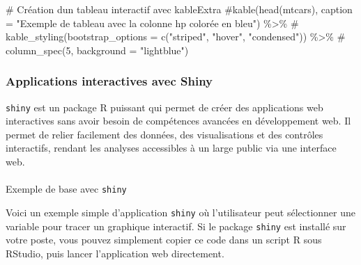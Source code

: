 \documentclass[
  letterpaper,
  DIV=11,
  numbers=noendperiod]{scrreprt}
\makeatletter
\let\oldparagraph\paragraph
\renewcommand{\paragraph}{
    \@ifstar
      \xxxParagraphStar
      \xxxParagraphNoStar
  }
\newcommand{\xxxParagraphStar}[1]{\oldparagraph*{#1}\mbox{}}
\newcommand{\xxxParagraphNoStar}[1]{\oldparagraph{#1}\mbox{}}
\newenvironment{Shaded}{\begin{snugshade}}{\end{snugshade}}
\newcommand{\CommentTok}[1]{\textcolor[rgb]{0.37,0.37,0.37}{#1}}
\makeatother
\begin{document}
\begin{Shaded}
\begin{Highlighting}[]
\CommentTok{\# Création d\textquotesingle{}un tableau interactif avec kableExtra}
\CommentTok{\#kable(head(mtcars), caption = "Exemple de tableau avec la colonne hp colorée en bleu") \%\textgreater{}\%}
\CommentTok{\#  kable\_styling(bootstrap\_options = c("striped", "hover", "condensed")) \%\textgreater{}\%}
\CommentTok{\#  column\_spec(5, background = "lightblue")}
\end{Highlighting}
\end{Shaded}

\subsubsection{Applications interactives avec
Shiny}\label{applications-interactives-avec-shiny}

\texttt{shiny} est un package R puissant qui permet de créer des
applications web interactives sans avoir besoin de compétences avancées
en développement web. Il permet de relier facilement des données, des
visualisations et des contrôles interactifs, rendant les analyses
accessibles à un large public via une interface web.

\paragraph{\texorpdfstring{Exemple de base avec
\texttt{shiny}}{Exemple de base avec shiny}}\label{exemple-de-base-avec-shiny}

Voici un exemple simple d'application \texttt{shiny} où l'utilisateur
peut sélectionner une variable pour tracer un graphique interactif. Si
le package \texttt{shiny} est installé sur votre poste, vous pouvez
simplement copier ce code dans un script R sous RStudio, puis lancer
l'application web directement.
\end{document}
